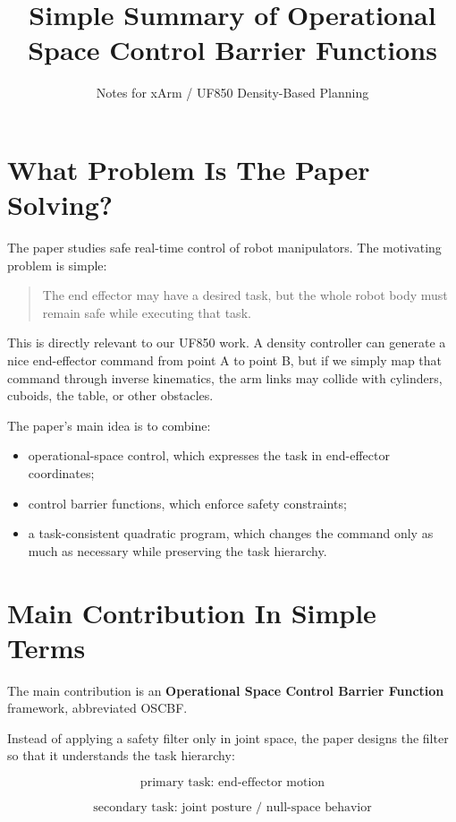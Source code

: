 \documentclass[11pt]{article}
\title{Simple Summary of Operational Space Control Barrier Functions}
\author{Notes for xArm / UF850 Density-Based Planning}
\date{}
\begin{document}
\maketitle

\section{What Problem Is The Paper Solving?}

The paper studies safe real-time control of robot manipulators. The motivating
problem is simple:

\begin{quote}
The end effector may have a desired task, but the whole robot body must remain
safe while executing that task.
\end{quote}

This is directly relevant to our UF850 work. A density controller can generate
a nice end-effector command from point A to point B, but if we simply map that
command through inverse kinematics, the arm links may collide with cylinders,
cuboids, the table, or other obstacles.

The paper's main idea is to combine:

\begin{itemize}[leftmargin=*]
    \item operational-space control, which expresses the task in end-effector
    coordinates;
    \item control barrier functions, which enforce safety constraints;
    \item a task-consistent quadratic program, which changes the command only
    as much as necessary while preserving the task hierarchy.
\end{itemize}

\section{Main Contribution In Simple Terms}

The main contribution is an \textbf{Operational Space Control Barrier Function}
framework, abbreviated OSCBF.

Instead of applying a safety filter only in joint space, the paper designs the
filter so that it understands the task hierarchy:

\[
\text{primary task: end-effector motion}
\]

\[
\text{secondary task: joint posture / null-space behavior}
\]
\end{document}
